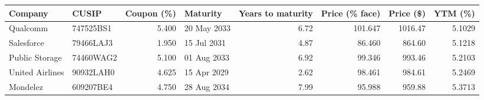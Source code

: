 
\begin{tabular}{llrlrrrr}
\toprule
Company & CUSIP & Coupon (\%) & Maturity & Years to maturity & Price (\% face) & Price (\$) & YTM (\%)\\
\midrule
Qualcomm & 747525BS1 & 5.400 & 20 May 2033 & 6.72 & 101.647 & 1016.47 & 5.1029\\
Salesforce & 79466LAJ3 & 1.950 & 15 Jul 2031 & 4.87 & 86.460 & 864.60 & 5.1218\\
Public Storage & 74460WAG2 & 5.100 & 01 Aug 2033 & 6.92 & 99.346 & 993.46 & 5.2103\\
United Airlines & 90932LAH0 & 4.625 & 15 Apr 2029 & 2.62 & 98.461 & 984.61 & 5.2469\\
Mondelez & 609207BE4 & 4.750 & 28 Aug 2034 & 7.99 & 95.988 & 959.88 & 5.3713\\
\bottomrule
\end{tabular}
